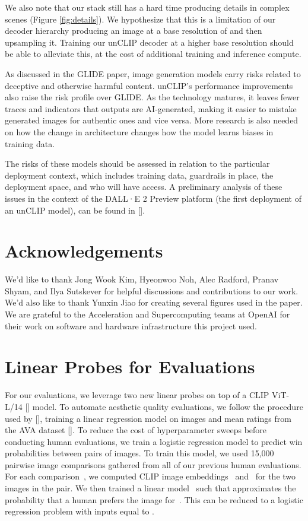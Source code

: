 \documentclass{article}
\newcommand{\shortcite}[1]{[\citenum{#1}]}
\newcommand{\namecite}[1]{\citeauthor{#1} [\citenum{#1}]}
\newcommand{\modelname}{unCLIP}
\begin{document}
We also note that our stack still has a hard time producing details in complex scenes (Figure \ref{fig:details}). We hypothesize that this is a limitation of our decoder hierarchy producing an image at a base resolution of  and then upsampling it. Training our \modelname{} decoder at a higher base resolution should be able to alleviate this, at the cost of additional training and inference compute. 

As discussed in the GLIDE paper, image generation models carry risks related to deceptive and otherwise harmful content. \modelname{}'s performance improvements also raise the risk profile over GLIDE. As the technology matures, it leaves fewer traces and indicators that outputs are AI-generated, making it easier to mistake generated images for authentic ones and vice versa. More research is also needed on how the change in architecture changes how the model learns biases in training data.

The risks of these models should be assessed in relation to the particular deployment context, which includes training data, guardrails in place, the deployment space, and who will have access. A preliminary analysis of these issues in the context of the DALL·E 2 Preview platform (the first deployment of an unCLIP model), can be found in \namecite{mishkin2022risks}.

\section{Acknowledgements}
We’d like to thank Jong Wook Kim,  Hyeonwoo Noh, Alec Radford, Pranav Shyam, and Ilya Sutskever for helpful discussions and contributions to our work. We'd also like to thank Yunxin Jiao for creating several figures used in the paper. We are grateful to the Acceleration and Supercomputing teams at OpenAI for their work on software and hardware infrastructure this project used. 




\clearpage
\appendix
\section{Linear Probes for Evaluations}
\label{app:linear_probes}

For our evaluations, we leverage two new linear probes on top of a CLIP ViT-L/14 \shortcite{vit} model. To automate aesthetic quality evaluations, we follow the procedure used by \namecite{avaprobe}, training a linear regression model on images and mean ratings from the AVA dataset \shortcite{avadataset}. To reduce the cost of hyperparameter sweeps before conducting human evaluations, we train a logistic regression model to predict win probabilities between pairs of images. To train this model, we used 15,000 pairwise image comparisons gathered from all of our previous human evaluations. For each comparison~, we computed CLIP image embeddings~ and~ for the two images in the pair. We then trained a linear model~ such that  approximates the probability that a human prefers the image for~. This can be reduced to a logistic regression problem with inputs equal to .
\end{document}
